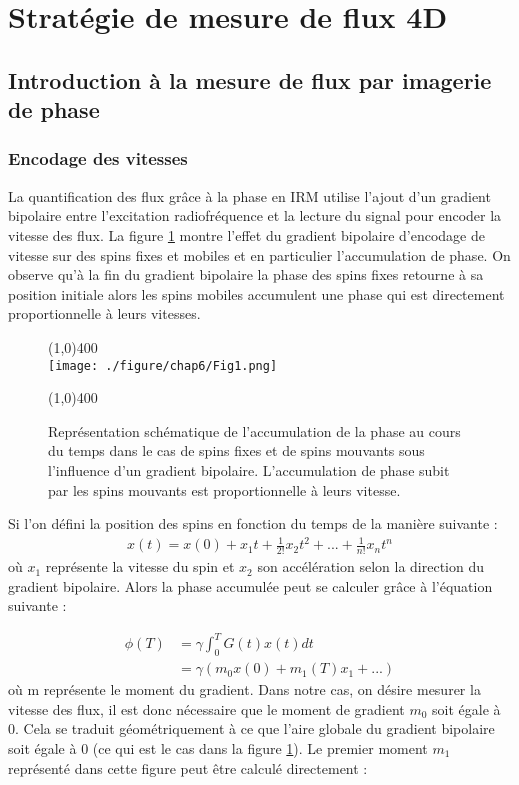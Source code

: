 \section{Stratégie de mesure de flux 4D}

\subsection{Introduction à la mesure de flux par imagerie de phase}

\subsubsection{Encodage des vitesses}

La quantification des flux grâce à la phase en IRM utilise l'ajout d'un gradient bipolaire entre l'excitation radiofréquence et la lecture du signal pour encoder la vitesse des flux. La figure \ref{fig:PhaseSpins} montre l'effet du gradient bipolaire d'encodage de vitesse sur des spins fixes et mobiles et en particulier l'accumulation de phase. On observe qu'à la fin du gradient bipolaire la phase des spins fixes retourne à sa position initiale alors les spins mobiles accumulent une phase qui est directement proportionnelle à leurs vitesses.

\begin{figure}[H]
\centering
\line(1,0){400} \\
\texttt{[image: ./figure/chap6/Fig1.png]}
\caption[Effet du gradient bipolaire]{\label{fig:PhaseSpins} Représentation schématique de l'accumulation de la phase au cours du temps dans le cas de spins fixes et de spins mouvants sous l'influence d'un gradient bipolaire. L'accumulation de phase subit par les spins mouvants est proportionnelle à leurs vitesse. }
\line(1,0){400} \\ 
\end{figure}
Si l'on défini la position des spins en fonction du temps de la manière suivante :
\begin{align}
x(t)=x(0) + x_1 t +\frac{1}{2!} x_2 t^2 + ... + \frac{1}{n!} x_n t^n
\end{align}
où $x_1$ représente la vitesse du spin et $x_2$ son accélération selon la direction du gradient bipolaire. Alors la phase accumulée peut se calculer grâce à l'équation suivante :

\begin{align}
\phi (T) &= \gamma \int_0^T G(t) x(t) dt \\
			 &= \gamma (m_0 x(0) + m_1(T) x_1 + ...)
\end{align}
où m représente le moment du gradient. 
	Dans notre cas, on désire mesurer la vitesse des flux, il est donc nécessaire que le moment de gradient $m_0$ soit égale à 0. Cela se traduit géométriquement à ce que l'aire globale du gradient bipolaire soit égale à 0 (ce qui est le cas dans la figure \ref{fig:PhaseSpins}). Le premier moment $m_1$ représenté dans cette figure peut être calculé directement :
	
